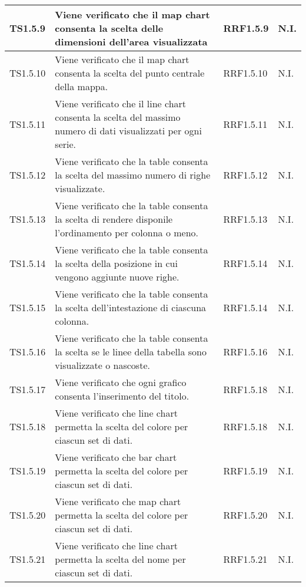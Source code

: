 \begin{longtabu}{| X[0.5] | X | X[0.5] | X[0.4] |}
TS1.5.9 & Viene verificato che il map chart consenta la scelta delle dimensioni dell'area visualizzata & RRF1.5.9 & N.I.\\ \hline

TS1.5.10 & Viene verificato che il map chart consenta la scelta del punto centrale della mappa. & RRF1.5.10 & N.I.\\ \hline

TS1.5.11 &	Viene verificato che il line chart consenta la scelta del massimo numero di dati visualizzati per ogni serie. & RRF1.5.11 & N.I.\\ \hline

TS1.5.12 & Viene verificato che la table consenta la scelta del massimo numero di righe visualizzate. & RRF1.5.12 & N.I.\\ \hline

TS1.5.13 &	Viene verificato che la table consenta la scelta di rendere disponile l'ordinamento per colonna o meno. & RRF1.5.13 & N.I.\\ \hline

TS1.5.14 & Viene verificato che la table consenta la scelta della posizione in cui vengono aggiunte nuove righe. & RRF1.5.14 & N.I.\\ \hline

TS1.5.15 & Viene verificato che la table consenta la scelta dell'intestazione di ciascuna colonna. & RRF1.5.14 & N.I.\\ \hline
 
TS1.5.16 & Viene verificato che la table consenta la scelta se le linee della tabella sono visualizzate o nascoste. & RRF1.5.16 & N.I.\\ \hline

TS1.5.17 & Viene verificato che ogni grafico consenta l'inserimento del titolo. & RRF1.5.18 & N.I.\\ \hline

TS1.5.18 & Viene verificato che line chart permetta la scelta del colore per ciascun set di dati. & RRF1.5.18 & N.I.\\ \hline

TS1.5.19 & Viene verificato che bar chart permetta la scelta del colore per ciascun set di dati. & RRF1.5.19 & N.I.\\ \hline

TS1.5.20 & Viene verificato che map chart permetta la scelta del colore per ciascun set di dati. & RRF1.5.20 & N.I.\\ \hline

TS1.5.21 &	Viene verificato che line chart permetta la scelta del nome per ciascun set di dati. & RRF1.5.21 & N.I.\\ \hline


\end{longtabu}
